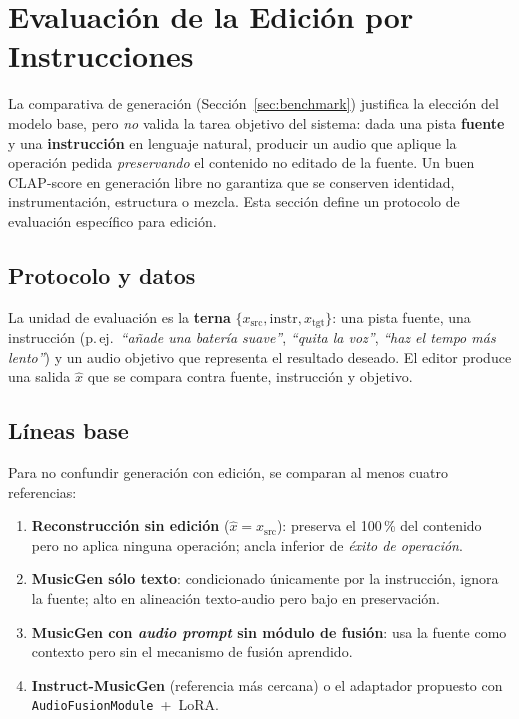 
\section{Evaluación de la Edición por Instrucciones}
\label{sec:edit}

La comparativa de generación (Sección~\ref{sec:benchmark}) justifica la
elección del modelo base, pero \emph{no} valida la tarea objetivo del sistema:
dada una pista \textbf{fuente} y una \textbf{instrucción} en lenguaje natural,
producir un audio que aplique la operación pedida \emph{preservando} el
contenido no editado de la fuente. Un buen CLAP-score en generación libre no
garantiza que se conserven identidad, instrumentación, estructura o mezcla.
Esta sección define un protocolo de evaluación específico para edición.

\subsection{Protocolo y datos}
\label{sec:edit:datos}

La unidad de evaluación es la \textbf{terna}
$\{x_{\text{src}}, \text{instr}, x_{\text{tgt}}\}$: una pista fuente, una
instrucción (p.\,ej.\ \textit{``añade una batería suave''}, \textit{``quita la
voz''}, \textit{``haz el tempo más lento''}) y un audio objetivo que
representa el resultado deseado. El editor produce una salida
$\hat{x}$ que se compara contra fuente, instrucción y objetivo.

\subsection{Líneas base}
\label{sec:edit:baselines}

Para no confundir generación con edición, se comparan al menos cuatro
referencias:
\begin{enumerate}
  \item \textbf{Reconstrucción sin edición} ($\hat{x} = x_{\text{src}}$):
        preserva el 100\,\% del contenido pero no aplica ninguna operación;
        ancla inferior de \emph{éxito de operación}.
  \item \textbf{MusicGen sólo texto}: condicionado únicamente por la
        instrucción, ignora la fuente; alto en alineación texto-audio pero
        bajo en preservación.
  \item \textbf{MusicGen con \textit{audio prompt} sin módulo de fusión}:
        usa la fuente como contexto pero sin el mecanismo de fusión aprendido.
  \item \textbf{Instruct-MusicGen} (referencia más cercana) o el adaptador
        propuesto con \texttt{AudioFusionModule}~+~LoRA.
\end{enumerate}

